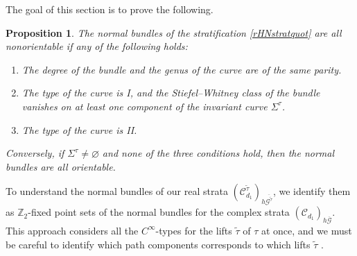 \documentclass[pdftex]{sigma}
\numberwithin{equation}{section}
\newtheorem{Proposition}[Theorem]{Proposition}
\begin{document}
The goal of this section is to prove the following.

\begin{Proposition}\label{orientableProp}
The normal bundles of the stratification \eqref{rHNstratquot} are all nonorientable if any of the following holds:
\begin{enumerate}\itemsep=0pt
\item[$1.$] The degree of the bundle and the genus of the curve are of the same parity.
\item[$2.$] The type of the curve is I, and the Stiefel--Whitney class of the bundle vanishes on at least one component of the invariant curve $\Sigma^{\tau}$.
\item[$3.$] The type of the curve is II.
\end{enumerate}
Conversely, if $\Sigma^{\tau} \neq \varnothing$ and none of the three conditions hold, then the normal bundles are all orientable.
\end{Proposition}

To understand the normal bundles of our real strata $({\mathcal C}_{d_1}^{\tilde{\tau}})_{h\overline{{\mathcal G}^{\tilde{\tau}}}}$, we identify them as ${\mathbb Z}_2$-f\/ixed point sets of the normal bundles for the complex strata $ ({\mathcal C}_{d_1})_{{h\overline{{\mathcal G}}} }$. This approach considers all the $C^{\infty}$-types for the lifts $\tilde{\tau}$ of $\tau$ at once, and we must be careful to identify which path components corresponds to which lifts $\tilde{\tau}$ .
\end{document}
